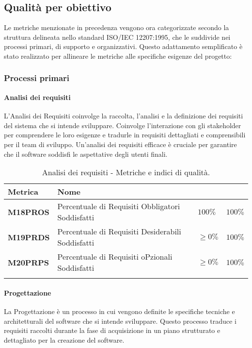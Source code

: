 \subsection{Qualità per obiettivo}
Le metriche menzionate in precedenza vengono ora categorizzate secondo la struttura delineata nello standard ISO/IEC 12207:1995, che le suddivide nei processi primari, di supporto e organizzativi. Questo adattamento semplificato è stato realizzato per allineare le metriche alle specifiche esigenze del progetto:

\subsubsection{Processi primari}
\paragraph{Analisi dei requisiti}
L'Analisi dei Requisiti coinvolge la raccolta, l'analisi e la definizione dei requisiti del sistema che si intende sviluppare. Coinvolge l'interazione con gli stakeholder per comprendere le loro esigenze e tradurle in requisiti dettagliati e comprensibili per il team di sviluppo. Un'analisi dei requisiti efficace è cruciale per garantire che il software soddisfi le aspettative degli utenti finali.
\hspace{1pt}
    \begin{longtable}{|C{1.5cm}|L{3cm}|L{2.5cm}|L{2.5cm}|}
        \hline
        \textbf{Metrica} & \textbf{Nome} & \textbf{} & \textbf{} \\
        \hline\textbf{M18PROS} & Percentuale di Requisiti Obbligatori Soddisfatti & $ 100\%$  & $ 100\%$ \\
        \hline
        \textbf{M19PRDS} & Percentuale di Requisiti Desiderabili Soddisfatti & $\geq 0\%$ & $100\%$ \\
        \hline
        \textbf{M20PRPS} & Percentuale di Requisiti oPzionali Soddisfatti & $\geq 0\%$ & $100\%$ \\
        \hline
    \caption{Analisi dei requisiti - Metriche e indici di qualità.}
    \label{tab:analisi_requisiti_progetto}
\end{longtable}

\paragraph{Progettazione}
La Progettazione è un processo in cui vengono definite le specifiche tecniche e architetturali del software che si intende sviluppare. Questo processo traduce i requisiti raccolti durante la fase di acquisizione in un piano strutturato e dettagliato per la creazione del software.

